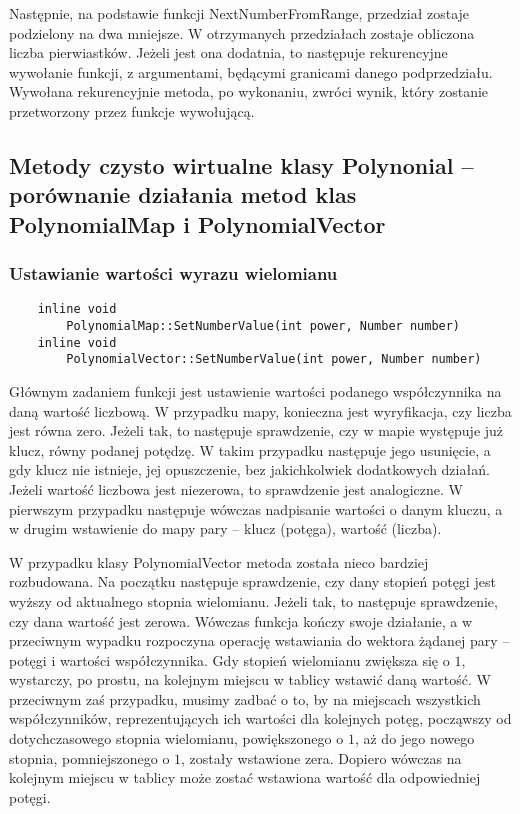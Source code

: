 \documentclass[oneside,a4paper]{book}
\begin{document}
	Następnie, na podstawie funkcji NextNumberFromRange, przedział zostaje podzielony na dwa mniejsze. W otrzymanych przedziałach zostaje obliczona liczba pierwiastków. Jeżeli jest ona dodatnia, to następuje rekurencyjne wywołanie funkcji, z argumentami, będącymi granicami danego podprzedziału. Wywołana rekurencyjnie metoda, po wykonaniu, zwróci wynik, który zostanie przetworzony przez funkcje wywołującą. 
	
	\subsection{Metody czysto wirtualne klasy Polynonial – porównanie działania metod klas PolynomialMap i PolynomialVector}
	
	\subsubsection{Ustawianie wartości wyrazu wielomianu}
	\begin{lstlisting}
	inline void
	    PolynomialMap::SetNumberValue(int power, Number number)
	inline void
	    PolynomialVector::SetNumberValue(int power, Number number)
	\end{lstlisting}
	
	Głównym zadaniem funkcji jest ustawienie wartości podanego współczynnika na daną wartość liczbową. W przypadku mapy, konieczna jest wyryfikacja, czy liczba jest równa zero. Jeżeli tak, to następuje sprawdzenie, czy w mapie występuje już klucz, równy podanej potędzę. W takim przypadku następuje jego usunięcie, a gdy klucz nie istnieje, jej opuszczenie, bez jakichkolwiek dodatkowych działań. Jeżeli wartość liczbowa jest niezerowa, to sprawdzenie jest analogiczne. W pierwszym przypadku następuje wówczas nadpisanie wartości o danym kluczu, a w drugim wstawienie do mapy pary – klucz (potęga), wartość (liczba).
	
	W przypadku klasy PolynomialVector metoda została nieco bardziej rozbudowana. Na początku następuje sprawdzenie, czy dany stopień potęgi jest wyższy od aktualnego stopnia wielomianu. Jeżeli tak, to następuje sprawdzenie, czy dana wartość jest zerowa. Wówczas funkcja kończy swoje działanie, a w przeciwnym wypadku rozpoczyna operację wstawiania do wektora żądanej pary – potęgi i wartości współczynnika. Gdy stopień wielomianu zwiększa się o $1$, wystarczy, po prostu, na kolejnym miejscu w tablicy wstawić daną wartość. W przeciwnym zaś przypadku, musimy zadbać o to, by na miejscach wszystkich współczynników, reprezentujących ich wartości dla kolejnych potęg, począwszy od dotychczasowego stopnia wielomianu, powiększonego o $1$, aż do jego nowego stopnia, pomniejszonego o $1$, zostały wstawione zera. Dopiero wówczas na kolejnym miejscu w tablicy może zostać wstawiona wartość dla odpowiedniej potęgi.
	
\end{document}
